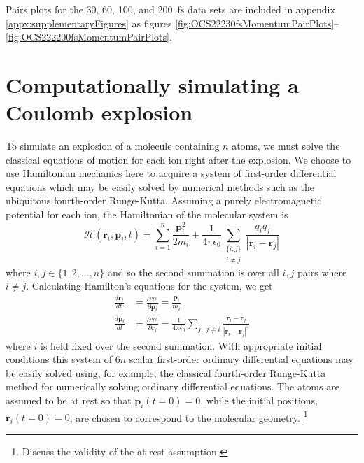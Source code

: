 Pairs plots for the 30, 60, 100, and \SI{200}{\fs} data sets are included in appendix \ref{appx:supplementaryFigures} as figures \ref{fig:OCS22230fsMomentumPairPlots}--\ref{fig:OCS222200fsMomentumPairPlots}.

\section{Computationally simulating a Coulomb explosion} \label{sec:simulating}
To simulate an explosion of a molecule containing $n$ atoms, we must solve the classical equations of motion for each ion right after the explosion. We choose to use Hamiltonian mechanics here to acquire a system of first-order differential equations which may be easily solved by numerical methods such as the ubiquitous fourth-order Runge-Kutta. Assuming a purely electromagnetic potential for each ion, the Hamiltonian of the molecular system is
\begin{equation}
\mathcal{H}(\mathbf{r}_i, \mathbf{p}_i, t) = \sum_{i=1}^n \frac{\mathbf{p}_i^2}{2m_i} + \frac{1}{4\pi\epsilon_0}\sum_{\substack{\lbrace i,j\rbrace\\ i \ne j}} \frac{q_iq_j}{|\mathbf{r}_i-\mathbf{r}_j|}
\end{equation}
where $i,j \in \lbrace 1,2,\dots, n \rbrace$ and so the second summation is over all $i,j$ pairs where $i \ne j$. Calculating Hamilton's equations for the system, we get
\begin{subequations}
  \begin{align}
  \frac{d\mathbf{r}_i}{dt} &= \frac{\partial \mathcal{H}}{\partial \mathbf{p}_i} = \frac{\mathbf{p}_i}{m_i} \\
  \frac{d\mathbf{p}_i}{dt} &= \frac{\partial \mathcal{H}}{\partial \mathbf{r}_i} = \frac{1}{4\pi\epsilon_0}\sum_{j, \; j \ne i} \frac{\mathbf{r}_i - \mathbf{r}_j}{|\mathbf{r}_i - \mathbf{r}_j|^3}
  \end{align}
\end{subequations}
where $i$ is held fixed over the second summation. With appropriate initial conditions this system of $6n$ scalar first-order ordinary differential equations may be easily solved using, for example, the classical fourth-order Runge-Kutta method for numerically solving ordinary differential equations. The atoms are assumed to be at rest so that $\mathbf{p}_i(t=0) = 0$, while the initial positions, $\mathbf{r}_i(t=0) = 0$, are chosen to correspond to the molecular geometry. \footnote{Discuss the validity of the at rest assumption.}

